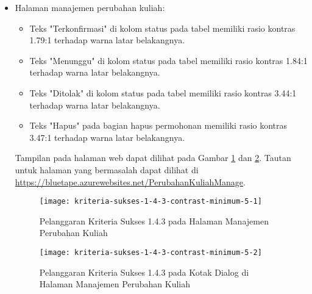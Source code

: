 \begin{itemize}
    \item Halaman manajemen perubahan kuliah: 
    \begin{itemize}
        \item Teks "Terkonfirmasi" di kolom status pada tabel memiliki rasio kontras 1.79:1 terhadap warna latar belakangnya.
        \item Teks "Menunggu" di kolom status pada tabel memiliki rasio kontras 1.84:1 terhadap warna latar belakangnya.
        \item Teks "Ditolak" di kolom status pada tabel memiliki rasio kontras 3.44:1 terhadap warna latar belakangnya.
        \item Teks "Hapus" pada bagian hapus permohonan memiliki rasio kontras 3.47:1 terhadap warna latar belakangnya.
    \end{itemize}
    Tampilan pada halaman web dapat dilihat pada Gambar \ref{fig:1.4.3_contrast_minimum_5_1} dan \ref{fig:1.4.3_contrast_minimum_5_2}. Tautan untuk halaman yang bermasalah dapat dilihat di \url{https://bluetape.azurewebsites.net/PerubahanKuliahManage}.
    \begin{figure}[H]
        \centering  
        \texttt{[image: kriteria-sukses-1-4-3-contrast-minimum-5-1]}  
        \caption[Pelanggaran Kriteria Sukses 1.4.3 pada Halaman Manajemen Perubahan Kuliah]{Pelanggaran Kriteria Sukses 1.4.3 pada Halaman Manajemen Perubahan Kuliah}
        \label{fig:1.4.3_contrast_minimum_5_1}
    \end{figure} 
    
    \begin{figure}[H]
        \centering  
        \texttt{[image: kriteria-sukses-1-4-3-contrast-minimum-5-2]}  
        \caption[Pelanggaran Kriteria Sukses 1.4.3 pada Kotak Dialog di Halaman Manajemen Perubahan Kuliah]{Pelanggaran Kriteria Sukses 1.4.3 pada Kotak Dialog di Halaman Manajemen Perubahan Kuliah}
        \label{fig:1.4.3_contrast_minimum_5_2}
    \end{figure} 


\end{itemize}

